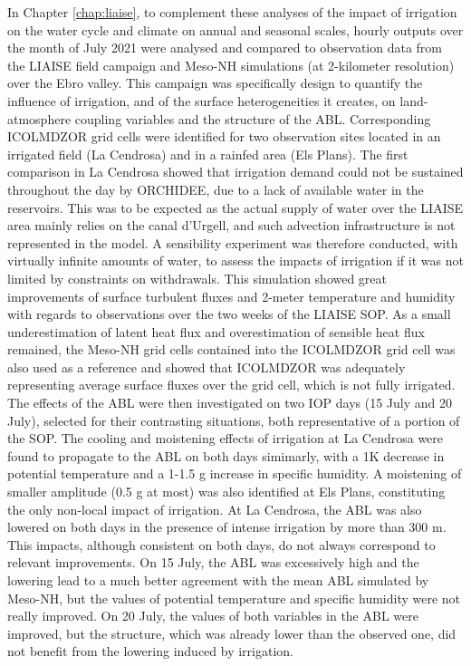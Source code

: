 \hfill

In Chapter \ref{chap:liaise}, to complement these analyses of the impact of irrigation on the water cycle and climate on annual and seasonal scales, hourly outputs over the month of July 2021 were analysed and compared to observation data from the LIAISE field campaign and Meso-NH simulations (at 2-kilometer resolution) over the Ebro valley. 
This campaign was specifically design to quantify the influence of irrigation, and of the surface heterogeneities it creates, on land-atmosphere coupling variables and the structure of the ABL.
Corresponding ICOLMDZOR grid cells were identified for two observation sites located in an irrigated field (La Cendrosa) and in a rainfed area (Els Plans).
The first comparison in La Cendrosa showed that irrigation demand could not be sustained throughout the day by ORCHIDEE, due to a lack of available water in the reservoirs. This was to be expected as the actual supply of water over the LIAISE area mainly relies on the canal d'Urgell, and such advection infrastructure is not represented in the model.
A sensibility experiment was therefore conducted, with virtually infinite amounts of water, to assess the impacts of irrigation if it was not limited by constraints on withdrawals.
This simulation showed great improvements of surface turbulent fluxes and 2-meter temperature and humidity with regards to observations over the two weeks of the LIAISE SOP.
As a small underestimation of latent heat flux and overestimation of sensible heat flux remained, the Meso-NH grid cells contained into the ICOLMDZOR grid cell was also used as a reference and showed that ICOLMDZOR was adequately representing average surface fluxes over the grid cell, which is not fully irrigated.
The effects of the ABL were then investigated on two IOP days (15 July and 20 July), selected for their contrasting situations, both representative of a portion of the SOP.
The cooling and moistening effects of irrigation at La Cendrosa were found to propagate to the ABL on both days simimarly, with a 1K decrease in potential temperature and a 1-1.5 g \perkg increase in specific humidity. A moistening of smaller amplitude (0.5 g \perkg at most) was also identified at Els Plans, constituting the only non-local impact of irrigation.
At La Cendrosa, the ABL was also lowered on both days in the presence of intense irrigation by more than 300 m.
This impacts, although consistent on both days, do not always correspond to relevant improvements. On 15 July, the ABL was excessively high and the lowering lead to a much better agreement with the mean ABL simulated by Meso-NH, but the values of potential temperature and specific humidity were not really improved. On 20 July, the values of both variables in the ABL were improved, but the structure, which was already lower than the observed one, did not benefit from the lowering induced by irrigation.

